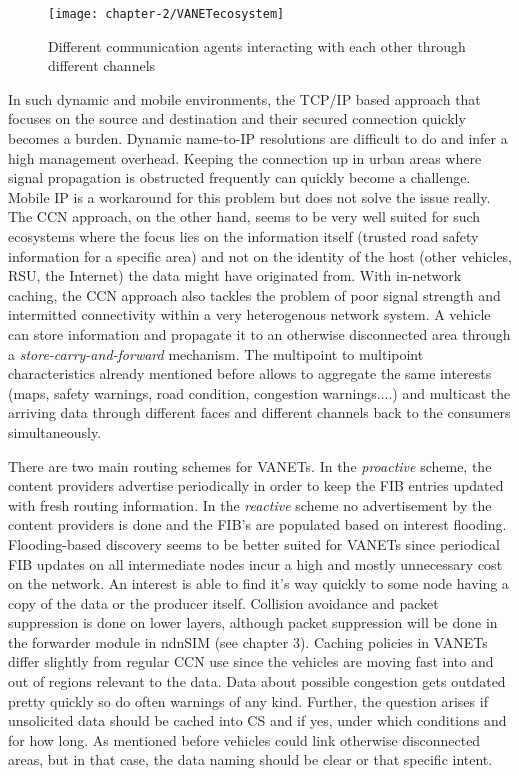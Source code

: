 \begin{figure}[H]
  \centering
  \texttt{[image: chapter-2/VANETecosystem]}
  \caption{Different communication agents interacting with each other through different channels}
  \label{fig:VANETecosystem}
\end{figure}

\vspace{5mm} %

In such dynamic and mobile environments, the TCP/IP based approach that focuses on the source and destination and their secured connection quickly becomes a burden. Dynamic name-to-IP resolutions are difficult to do and infer a high management overhead. Keeping the connection up in urban areas where signal propagation is obstructed frequently can quickly become a challenge. Mobile IP is a workaround for this problem but does not solve the issue really. The CCN approach, on the other hand, seems to be very well suited for such ecosystems where the focus lies on the information itself (trusted road safety information for a specific area) and not on the identity of the host (other vehicles, RSU, the Internet) the data might have originated from. With in-network caching, the CCN approach also tackles the problem of poor signal strength and intermitted connectivity within a very heterogenous network system. A vehicle can store information and propagate it to an otherwise disconnected area through a \emph{store-carry-and-forward} mechanism. The multipoint to multipoint characteristics already mentioned before allows to aggregate the same interests (maps, safety warnings, road condition, congestion warnings....) and multicast the arriving data through different faces and different channels back to the consumers simultaneously.

\vspace{5mm} %

There are two main routing schemes for VANETs. In the \emph{proactive} scheme, the content providers advertise periodically in order to keep the FIB entries updated with fresh routing information. In the \emph{reactive} scheme no advertisement by the content providers is done and the FIB's are populated based on interest flooding. Flooding-based discovery seems to be better suited for VANETs since periodical FIB updates on all intermediate nodes incur a high and mostly unnecessary cost on the network. An interest is able to find it's way quickly to some node having a copy of the data or the producer itself. Collision avoidance and packet suppression is done on lower layers, although packet suppression will be done in the forwarder module in ndnSIM (see chapter 3).
Caching policies in VANETs differ slightly from regular CCN use since the vehicles are moving fast into and out of regions relevant to the data. Data about possible congestion gets outdated pretty quickly so do often warnings of any kind. Further, the question arises if unsolicited data should be cached into CS and if yes, under which conditions and for how long. As mentioned before vehicles could link otherwise disconnected areas, but in that case, the data naming should be clear or that specific intent.

